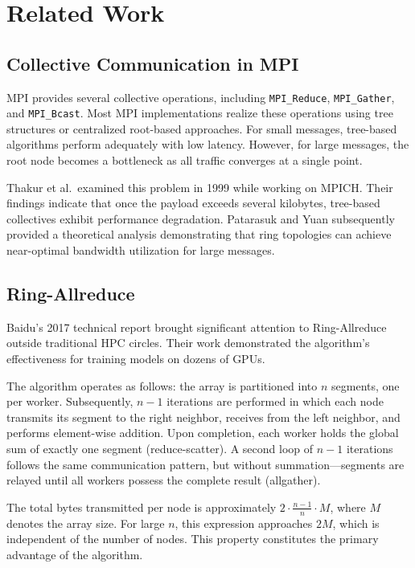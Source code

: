 \documentclass[12pt,a4paper]{article}
\begin{document}
\newpage

\section{Related Work}

\subsection{Collective Communication in MPI}

MPI provides several collective operations, including \texttt{MPI\_Reduce}, \texttt{MPI\_Gather}, and \texttt{MPI\_Bcast}. Most MPI implementations realize these operations using tree structures or centralized root-based approaches. For small messages, tree-based algorithms perform adequately with low latency. However, for large messages, the root node becomes a bottleneck as all traffic converges at a single point.

Thakur et al.\ examined this problem in 1999 while working on MPICH. Their findings indicate that once the payload exceeds several kilobytes, tree-based collectives exhibit performance degradation. Patarasuk and Yuan subsequently provided a theoretical analysis demonstrating that ring topologies can achieve near-optimal bandwidth utilization for large messages.

\subsection{Ring-Allreduce}

Baidu's 2017 technical report brought significant attention to Ring-Allreduce outside traditional HPC circles. Their work demonstrated the algorithm's effectiveness for training models on dozens of GPUs.

The algorithm operates as follows: the array is partitioned into $n$ segments, one per worker. Subsequently, $n-1$ iterations are performed in which each node transmits its segment to the right neighbor, receives from the left neighbor, and performs element-wise addition. Upon completion, each worker holds the global sum of exactly one segment (reduce-scatter). A second loop of $n-1$ iterations follows the same communication pattern, but without summation---segments are relayed until all workers possess the complete result (allgather).

The total bytes transmitted per node is approximately $2 \cdot \frac{n-1}{n} \cdot M$, where $M$ denotes the array size. For large $n$, this expression approaches $2M$, which is independent of the number of nodes. This property constitutes the primary advantage of the algorithm.
\end{document}
